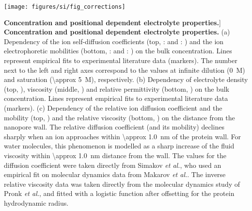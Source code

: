 
\begin{figure*}[b]

\centering

\texttt{[image: figures/si/fig\_corrections]}

\caption
[\textbf{Concentration and positional dependent electrolyte properties.}]
{
\textbf{Concentration and positional dependent electrolyte properties.}
(a) Dependency of the ion self-diffusion coefficients (top, :  and : ) and the ion electrophoretic mobilities (bottom, :  and : ) on the bulk  concentration. Lines represent empirical fits to experimental literature data (markers). The number next to the left and right axes correspond to the values at infinite dilution (\SI{0}{M}) and saturation (\SI{\approx 5}{M}), respectively.
(b) Dependency of electrolyte density (top, ), viscosity (middle, ) and relative permittivity (bottom, ) on the bulk  concentration. Lines represent empirical fits to experimental literature data (markers).
(c) Dependency of the relative ion diffusion coefficient and the mobility (top, ) and the relative viscosity (bottom, ) on the distance from the nanopore wall. The relative diffusion coefficient (and its mobility) declines sharply when an ion approaches within \SI{\approx 1.0}{\nm} of the protein wall. For water molecules, this phenomenon is modelled as a sharp increase of the fluid viscosity within \SI{\approx 1.0}{\nm} distance from the wall.
The values for the diffusion coefficient were taken directly from Simakov \textit{et al.}\cite{simakov2010}, who used an empirical fit on molecular dynamics data from Makarov \textit{et al.}\cite{makarov1998}. The inverse relative viscosity data was taken directly from the molecular dynamics study of Pronk \textit{et al.}\cite{pronk2013}, and fitted with a logistic function after offsetting for the protein hydrodynamic radius.
}

\label{fig:corrections}

\end{figure*}


